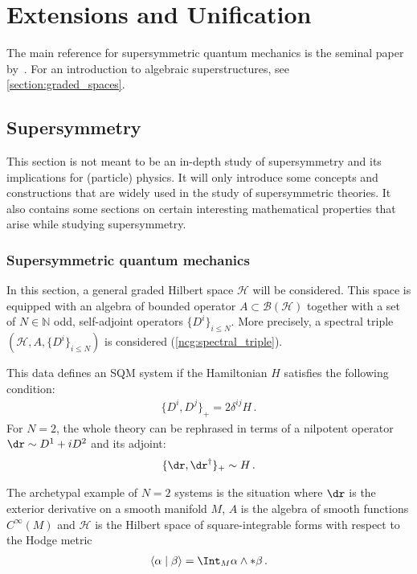 \chapter{Extensions and Unification}\label{chapter:unification}

    The main reference for supersymmetric quantum mechanics is the seminal paper by~\citet{witten_supersymmetry_1982}. For an introduction to algebraic superstructures, see \cref{section:graded_spaces}.

\section{Supersymmetry}

    This section is not meant to be an in-depth study of supersymmetry and its implications for (particle) physics. It will only introduce some concepts and constructions that are widely used in the study of supersymmetric theories. It also contains some sections on certain interesting mathematical properties that arise while studying supersymmetry.

\subsection{Supersymmetric quantum mechanics}

    In this section, a general graded Hilbert space $\mathcal{H}$ will be considered. This space is equipped with an algebra of bounded operator $A\subset\mathcal{B}(\mathcal{H})$ together with a set of $N\in\mathbb{N}$ odd, self-adjoint operators $\{D^i\}_{i\leq N}$. More precisely, a spectral triple $(\mathcal{H},A,\{D^i\}_{i\leq N})$ is considered (\cref{ncg:spectral_triple}).

    This data defines an SQM system if the Hamiltonian $H$ satisfies the following condition:
    \begin{gather}
        \{D^i,D^j\}_+ = 2\delta^{ij}H\,.
    \end{gather}
    For $N=2$, the whole theory can be rephrased in terms of a nilpotent operator $\dr\sim D^1+iD^2$ and its adjoint:
    \begin{gather}
        \{\dr,\dr^\dagger\}_+\sim H\,.
    \end{gather}

    \begin{example}
        The archetypal example of $N=2$ systems is the situation where $\dr$ is the exterior derivative on a smooth manifold $M$, $A$ is the algebra of smooth functions $C^\infty(M)$ and $\mathcal{H}$ is the Hilbert space of square-integrable forms with respect to the Hodge metric
        \begin{gather}
            \langle\alpha\mid\beta\rangle = \Int_M\alpha\wedge\ast\beta\,.
        \end{gather}
    \end{example}

